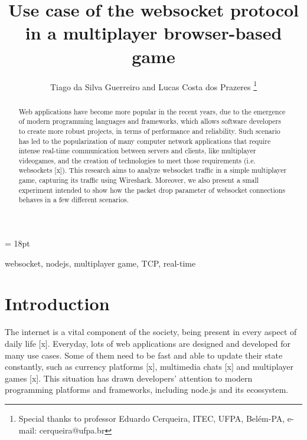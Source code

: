 \documentclass[english]{sbrt}
\begin{document}
\title{Use case of the websocket protocol in a multiplayer browser-based game}

\author{Tiago da Silva Guerreiro and Lucas Costa dos Prazeres
  \thanks{Special thanks to professor Eduardo Cerqueira, ITEC, UFPA, Belém-PA, e-mail: cerqueira@ufpa.br}
}

\maketitle

\baselineskip = 18pt


\begin{abstract}
  Web applications have become more popular in the recent years, due to the emergence of modern programming languages and frameworks, which allows software developers to create more robust projects, in terms of performance and reliability.
  Such scenario has led to the popularization of many computer network applications that require intense real-time communication between servers and clients, like multiplayer videogames, and the creation of technologies to meet those requirements (i.e. websockets [x]).
  This research aims to analyze websocket traffic in a simple multiplayer game, capturing its traffic using Wireshark.
  Moreover, we also present a small experiment intended to show how the packet drop parameter of websocket connections behaves in a few different scenarios.

\end{abstract}
\begin{keywords}
  websocket, nodejs, multiplayer game, TCP, real-time
\end{keywords}

\section{\textbf{Introduction}}

The internet is a vital component of the society, being present in every aspect of daily life [x].
Everyday, lots of web applications are designed and developed for
many use cases. Some of them need to be fast and able to update their state constantly, such as currency platforms [x], multimedia chats [x] and multiplayer games [x].
This situation has drawn developers' attention to modern programming platforms and frameworks, including node.js and its ecossystem.
\end{document}
